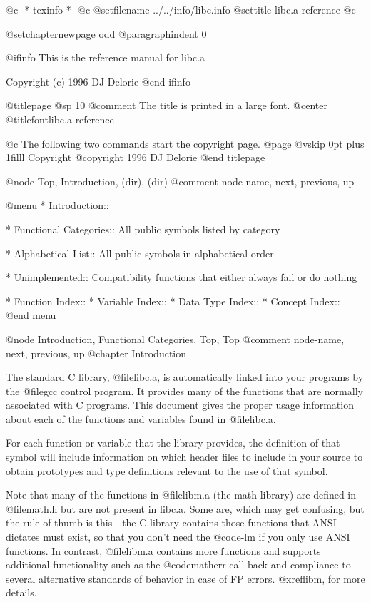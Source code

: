    @c -*-texinfo-*-
@c %
@setfilename ../../info/libc.info
@settitle libc.a reference
@c %

@setchapternewpage odd
@paragraphindent 0

@ifinfo
This is the reference manual for libc.a

Copyright (c) 1996 DJ Delorie
@end ifinfo

@titlepage
@sp 10
@comment The title is printed in a large font.
@center @titlefont{libc.a reference}

@c The following two commands start the copyright page.
@page
@vskip 0pt plus 1filll
Copyright @copyright{} 1996 DJ Delorie
@end titlepage

@node    Top,       Introduction,  (dir),    (dir)
@comment node-name, next,          previous, up

@menu
* Introduction::

* Functional Categories::  All public symbols listed by
                           category

* Alphabetical List::      All public symbols in alphabetical
                           order

* Unimplemented::          Compatibility functions that either
                           always fail or do nothing

* Function Index::
* Variable Index::
* Data Type Index::
* Concept Index::
@end menu

@node    Introduction, Functional Categories, Top,      Top
@comment node-name,    next,                  previous, up
@chapter Introduction

The standard C library, @file{libc.a}, is automatically linked into your
programs by the @file{gcc} control program.  It provides many of the
functions that are normally associated with C programs.  This document
gives the proper usage information about each of the functions and
variables found in @file{libc.a}.

For each function or variable that the library provides, the definition
of that symbol will include information on which header files to include
in your source to obtain prototypes and type definitions relevant to the
use of that symbol.

Note that many of the functions in @file{libm.a} (the math library) are
defined in @file{math.h} but are not present in libc.a.  Some are, which
may get confusing, but the rule of thumb is this---the C library
contains those functions that ANSI dictates must exist, so that you
don't need the @code{-lm} if you only use ANSI functions.  In contrast,
@file{libm.a} contains more functions and supports additional
functionality such as the @code{matherr} call-back and compliance to
several alternative standards of behavior in case of FP errors.
@xref{libm}, for more details.

